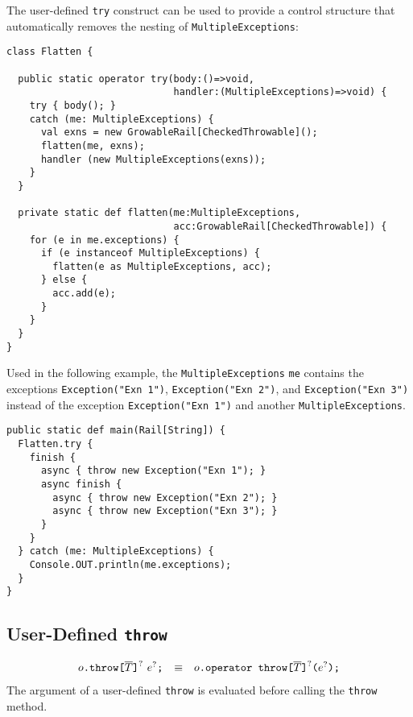 \begin{example}
  The user-defined \verb+try+ construct can be used to provide a
  control structure that automatically removes the nesting of
  \verb+MultipleExceptions+:
\begin{verbatim}
class Flatten {

  public static operator try(body:()=>void,
                             handler:(MultipleExceptions)=>void) {
    try { body(); }
    catch (me: MultipleExceptions) {
      val exns = new GrowableRail[CheckedThrowable]();
      flatten(me, exns);
      handler (new MultipleExceptions(exns));
    }
  }

  private static def flatten(me:MultipleExceptions,
                             acc:GrowableRail[CheckedThrowable]) {
    for (e in me.exceptions) {
      if (e instanceof MultipleExceptions) {
        flatten(e as MultipleExceptions, acc);
      } else {
        acc.add(e);
      }
    }
  }
}
\end{verbatim}

  Used in the following example, the \verb+MultipleExceptions+
  \verb+me+ contains the exceptions \verb+Exception("Exn 1")+,
  \verb+Exception("Exn 2")+, and \verb+Exception("Exn 3")+ instead of
  the exception \verb+Exception("Exn 1")+ and another
  \verb+MultipleExceptions+.
\begin{verbatim}
public static def main(Rail[String]) {
  Flatten.try {
    finish {
      async { throw new Exception("Exn 1"); }
      async finish {
        async { throw new Exception("Exn 2"); }
        async { throw new Exception("Exn 3"); }
      }
    }
  } catch (me: MultipleExceptions) {
    Console.OUT.println(me.exceptions);
  }
}
\end{verbatim}

\end{example}

\subsection{User-Defined \texttt{throw}}

$$
\begin{array}{rcl}
  {o}\texttt{.throw}\texttt{[}{\overline{T}}\texttt{]}^?~{e}^?\texttt{;}
  & \equiv &
  {o}\texttt{.operator throw}\texttt{[}{\overline{T}}\texttt{]}^?\texttt{(}{e}^?\texttt{);}
\end{array}
$$
The argument of a user-defined \verb+throw+ is evaluated before
calling the \verb+throw+ method.


